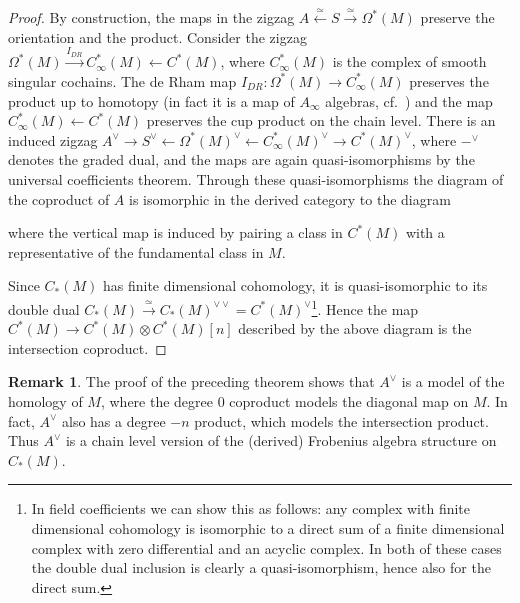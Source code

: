 \documentclass{scrartcl}
\theoremstyle{plain}
\theoremstyle{definition}
\newtheorem{remark}[theorem]{Remark}
\newcommand{\quiso}{\simeq}
\newcommand{\from}{\leftarrow}
\let\xto\xrightarrow
\let\xfrom\xleftarrow
\newcommand{\blank}{-}
\begin{document}
\begin{proof}
By construction, the maps in the zigzag $A\xfrom{\quiso} S \xto{\quiso} \Omega^*(M)$ preserve the orientation and the product. Consider the zigzag $\Omega^*(M)\xto{I_{DR}} C^*_\infty(M) \from C^*(M)$, where $C^*_{\infty}(M)$ is the complex of smooth singular cochains. The de Rham map $I_{DR}\colon \Omega^*(M)\to C^*_\infty(M)$ preserves the product up to homotopy (in fact it is a map of $A_\infty$ algebras, cf.\ \cite{gugenheim1977chen}) and the map $C^*_\infty(M) \from C^*(M)$ preserves the cup product on the chain level. There is an induced zigzag $A^\vee \to S^\vee\from \Omega^*(M)^\vee \from C^*_\infty(M)^\vee \to C^*(M)^\vee$, where $\blank^\vee$ denotes the graded dual, and the maps are again quasi-isomorphisms by the universal coefficients theorem. Through these quasi-isomorphisms the diagram of the coproduct of $A$ is isomorphic in the derived category to the diagram
\begin{center}
\end{center}
where the vertical map is induced by pairing a class in $C^*(M)$ with a representative of the fundamental class in $M$.

Since $C_*(M)$ has finite dimensional cohomology, it is quasi-isomorphic to its double dual $C_*(M)\xto{\quiso} C_*(M)^{\vee\vee} = C^*(M)^\vee$\footnote{In field coefficients we can show this as follows: any complex with finite dimensional cohomology is isomorphic to a direct sum of a finite dimensional complex with zero differential and an acyclic complex. In both of these cases the double dual inclusion is clearly a quasi-isomorphism, hence also for the direct sum. }. Hence the map $C^*(M) \to C^{*}(M)\otimes C^*(M)[n]$ described by the above diagram is the intersection coproduct. 
\end{proof}

\begin{remark}
    The proof of the preceding theorem shows that $A^\vee$ is a model of the homology of $M$, where the degree $0$ coproduct models the diagonal map on $M$. In fact, $A^\vee$ also has a degree $-n$ product, which models the intersection product. Thus $A^\vee$ is a chain level version of the (derived) Frobenius algebra structure on $C_*(M)$. 
\end{remark}
\end{document}
